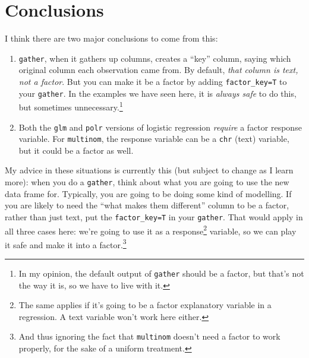 \documentclass{article}\usepackage[]{graphicx}\usepackage[]{color}
\begin{document}
\section{Conclusions}

I think there are two major conclusions to come from this:

\begin{enumerate}
\item \texttt{gather}, when it gathers up columns, creates a ``key''
  column, saying which original column each observation came from. By
  default, \emph{that column is text, not a factor}. But you can make
  it be a factor by adding \verb-factor_key=T- to your
  \texttt{gather}. In the examples we have seen here, it is
  \emph{always safe} to do this, but sometimes
  unnecessary.\footnote{In my opinion, the default output of
    \texttt{gather} should be a factor, but that's not the way it is,
    so we have to live with it.}
  
\item Both the \texttt{glm} and \texttt{polr} versions of logistic
  regression \emph{require} a factor response variable. For
  \texttt{multinom}, the response variable can be a \texttt{chr}
  (text) variable, but it could be a factor as well.
\end{enumerate}

My advice in these situations is currently this (but subject to change
as I learn more): when you do a \texttt{gather}, think about what
you are going to use the new data frame for. Typically, you are going
to be doing some kind of modelling. If you are likely to need the
``what makes them different'' column to be a factor, rather than just
text, put the \verb-factor_key=T- in your \texttt{gather}. That would
apply in all three cases here: we're going to use it as a
response\footnote{The same applies if it's going to be a factor
  explanatory variable in a regression. A text variable won't work
  here either.}
variable, so we can play it safe and make it into a
factor.\footnote{And thus ignoring the fact that \texttt{multinom}
  doesn't need a factor to work properly, for the sake of a uniform treatment.}
\end{document}
